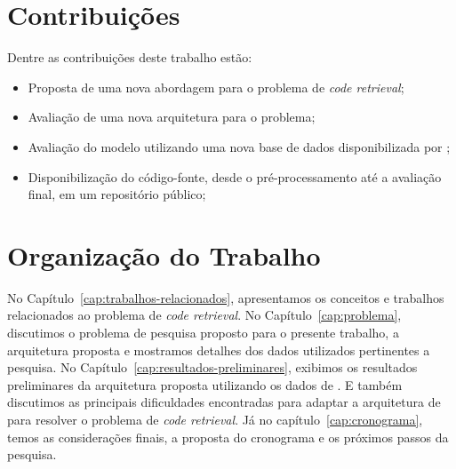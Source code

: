 \section{Contribuições}
\label{sec:contribucoes}

Dentre as contribuições deste trabalho estão:

\begin{itemize}
\item Proposta de uma nova abordagem para o problema de \textit{code retrieval};
\item Avaliação de uma nova arquitetura para o problema;
\item Avaliação do modelo utilizando uma nova base de dados disponibilizada por \cite{yao-2018};
\item Disponibilização do código-fonte, desde o pré-processamento até a avaliação final, em um repositório público;
\end{itemize}

\section{Organização do Trabalho}
\label{sec:organizacao_trabalho}

No Capítulo~\ref{cap:trabalhos-relacionados}, apresentamos os conceitos e trabalhos relacionados ao problema de \textit{code retrieval}. No Capítulo~\ref{cap:problema}, discutimos o problema de pesquisa proposto para o presente trabalho, a arquitetura proposta e mostramos detalhes dos dados utilizados pertinentes a pesquisa. 
No Capítulo~\ref{cap:resultados-preliminares}, exibimos os resultados preliminares da arquitetura proposta utilizando os dados de \cite{yao-2018}. E também discutimos as principais dificuldades encontradas para adaptar a arquitetura de \cite{tan-lstm-qa} para resolver o problema de \textit{code retrieval}. Já no capítulo~\ref{cap:cronograma}, temos as considerações finais, a proposta do cronograma e os próximos passos da pesquisa.